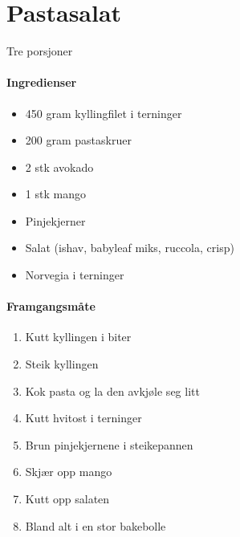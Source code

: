 \section{﻿Pastasalat}
Tre porsjoner

\paragraph{Ingredienser}
\begin{itemize}[noitemsep]
	\item 450 gram kyllingfilet i terninger
	\item 200 gram pastaskruer
	\item 2 stk avokado
	\item 1 stk mango
	\item Pinjekjerner
	\item Salat (ishav, babyleaf miks, ruccola, crisp)
	\item Norvegia i terninger
\end{itemize}

\paragraph{Framgangsmåte}
\begin{enumerate}[noitemsep]
	\item Kutt kyllingen i biter
	\item Steik kyllingen
	\item Kok pasta og la den avkjøle seg litt
	\item Kutt hvitost i terninger
	\item Brun pinjekjernene i steikepannen
	\item Skjær opp mango 
	\item Kutt opp salaten
	\item Bland alt i en stor bakebolle
\end{enumerate}
